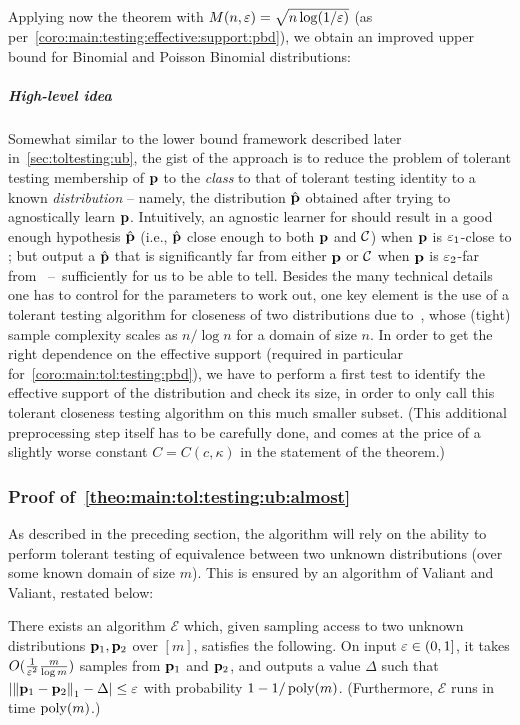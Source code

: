 \coromaintoltestingmlogm*

Applying now the theorem with $M(n,\varepsilon)=\sqrt{n\log(1/\varepsilon)}$ (as per~\cref{coro:main:testing:effective:support:pbd}), we obtain an improved upper bound for Binomial and Poisson Binomial distributions: 
\coromaintoltestingpbd*

\subparagraph{High-level idea} Somewhat similar to the lower bound framework described later in~\cref{sec:toltesting:ub}, the gist of the approach is to reduce the problem of tolerant testing membership of $\mathbf{p}$ to the \emph{class} \class to that of tolerant testing identity to a known \emph{distribution} -- namely, the distribution $\hat{\mathbf{p}}$ obtained after trying to agnostically learn $\mathbf{p}$. Intuitively, an agnostic learner for \class should result in a good enough hypothesis $\hat{\mathbf{p}}$ (i.e., $\hat{\mathbf{p}}$ close enough to both $\mathbf{p}$ and $\mathcal{C}$) when $\mathbf{p}$ is $\varepsilon_1$-close to \class; but output a $\hat{\mathbf{p}}$ that is significantly far from either $\mathbf{p}$ or $\mathcal{C}$ when $\mathbf{p}$ is $\varepsilon_2$-far from \class~--~sufficiently for us to be able to tell.
Besides the many technical details one has to control for the parameters to work out, one key element is the use of a tolerant testing algorithm for closeness of two distributions due to~\cite{ValiantValiant:11}, whose (tight) sample complexity scales as $n/\log n$ for a domain of size $n$. In order to get the right dependence on the effective support (required in particular for~\cref{coro:main:tol:testing:pbd}), we have to perform a first test to identify the effective support of the distribution and check its size, in order to only call this tolerant closeness testing algorithm on this much smaller subset. (This additional preprocessing step itself has to be carefully done, and comes at the price of a slightly worse constant $C=C(c,\kappa)$ in the statement of the theorem.)

\subsubsection{Proof of~\cref{theo:main:tol:testing:ub:almost}}

As described in the preceding section, the algorithm will rely on the ability to perform tolerant testing of equivalence between two unknown distributions (over some known domain of size $m$). This is ensured by an algorithm of Valiant and Valiant, restated below:
\begin{theorem}\label{theo:samp:closeness:tolerant}
    There exists an algorithm $\mathcal{E}$ which, given sampling access to two unknown distributions $\mathbf{p}_1,\mathbf{p}_2$ over $[m]$, satisfies the following. On input $\varepsilon\in(0,1]$, it takes $O( \frac{1}{\varepsilon^2}\frac{m}{\log m} )$ samples from $\mathbf{p}_1$ and $\mathbf{p}_2$, and outputs a value $\Delta$ such that $\lvert {\lVert\ensuremath{\mathbf{p}}_1-\ensuremath{\mathbf{p}}_2{\rVert}}_1-\Delta \rvert \leq \varepsilon$ with probability $1-1/\operatorname*{poly}(m)$. (Furthermore, $\mathcal{E}$ runs in time $\operatorname*{poly}(m)$.)
\end{theorem}


